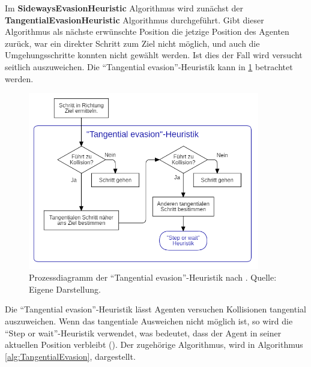 Im \textbf{SidewaysEvasionHeuristic} Algorithmus wird zunächst der \textbf{TangentialEvasionHeuristic} Algorithmus durchgeführt. Gibt dieser Algorithmus als nächste erwünschte Position die jetzige Position des Agenten zurück, war ein direkter Schritt zum Ziel nicht möglich, und auch die Umgehungsschritte konnten nicht gewählt werden. Ist dies der Fall wird versucht seitlich auszuweichen.
Die "`Tangential evasion"'-Heuristik kann in \ref{fig:tangentialHeuristik} betrachtet werden.
\begin{figure}[H]
	\centering
		\includegraphics[width=0.9\textwidth]{pictures/model/algorithm/heuristics/tangential_evasion_heuristic.png}
	\caption{Prozessdiagramm der "`Tangential evasion"'-Heuristik nach \cite{Seitz.2016}. Quelle: Eigene Darstellung.}
	\label{fig:tangentialHeuristik}
\end{figure} 
Die "`Tangential evasion"'-Heuristik lässt Agenten versuchen Kollisionen tangential auszuweichen. Wenn das tangentiale Ausweichen nicht möglich ist, so wird die "`Step or wait"'-Heuristik verwendet, was bedeutet, dass der Agent in seiner aktuellen Position verbleibt (\cite{Seitz.2016}). Der zugehörige Algorithmus, wird in Algorithmus \ref{alg:TangentialEvasion}, dargestellt.
\clearpage
